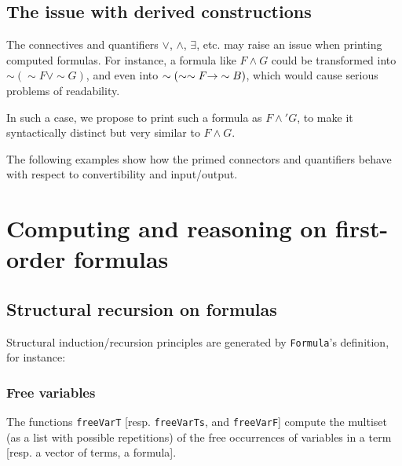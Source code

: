

\subsection{The issue with derived constructions}
\label{sect:fol-issue}


The connectives and quantifiers $\vee$, $\wedge$, $\exists$, etc. may raise an issue when printing computed formulas.
For instance, a formula like $F \wedge G$ could be transformed into $\sim(\sim F \vee \sim G)$,  and even
into $\sim(\sim\sim F \mbox{$\rightarrow$} \sim B)$, which would 
cause serious problems of readability.

In such a case, we propose to print such a formula as $F \wedge' G$, to make it syntactically distinct but very similar to $F \wedge G$.


The following examples show how the primed connectors 
and quantifiers behave with respect to convertibility and 
input/output.














\section{Computing and reasoning on first-order formulas}


\subsection{Structural recursion on formulas}

Structural induction/recursion principles are generated by 
\texttt{Formula}'s definition, for instance:


\subsubsection{Free variables}
The functions \texttt{freeVarT} [resp. \texttt{freeVarTs},  and
\texttt{freeVarF}] compute the multiset (as a list with possible repetitions) of the free occurrences of variables in a term [resp. a vector of terms, a formula].

